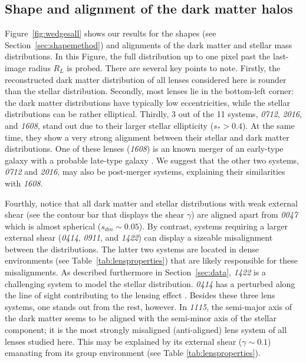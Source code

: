 \documentclass[useAMS,usenatbib]{mn2e}
\begin{document}
\subsection{Shape and alignment of the dark matter halos}
Figure~\ref{fig:wedgesall} shows our results for the shapes (see Section~\ref{sec:shapemethod}) and alignments of the dark matter and stellar mass distributions. In this Figure, the full distribution up to one pixel past the last-image radius $R_{L}$ is probed. There are several key points to note. Firstly, the reconstructed dark matter distribution of all lenses considered here is rounder than the stellar distribution. Secondly, most lenses lie in the bottom-left corner: the dark matter distributions have typically low eccentricities, while the stellar distributions can be rather elliptical. Thirdly, 3 out of the 11 systems, {\it0712}, {\it2016}, and {\it1608}, stand out due to their larger stellar ellipticity ($s_* > 0.4$). At the same time, they show a very strong alignment between their stellar and dark matter distributions. One of these lenses ({\it1608}) is an known merger of an early-type galaxy with a probable late-type galaxy \citep{2003ApJ...584..100S}. We suggest that the other two systems, {\it0712} and {\it2016}, may also be post-merger systems, explaining their similarities with {\it1608}.

Fourthly, notice that all dark matter and stellar distributions with weak external shear (see the contour bar that displays the shear $\gamma$) are aligned apart from {\it0047} which is almost spherical ($s_{dm}\sim0.05$). By contrast, systems requiring a larger external shear ({\it0414}, {\it0911}, and {\it1422}) can display a sizeable misalignment between the distributions. The latter two systems are located in dense environments (see Table~\ref{tab:lensproperties}) that are likely responsible for these misalignments. As described furthermore in Section~\ref{sec:data}, {\it1422} is a challenging system to model the stellar distribution. {\it0414} has a perturbed along the line of sight contributing to the lensing effect \citep{2011MNRAS.413L..86C}. Besides these three lens systems, one stands out from the rest, however. In {\it1115}, the semi-major axis of the dark matter seems to be aligned with the semi-minor axis of the stellar component; it is the most strongly misaligned (anti-aligned) lens system of all lenses studied here. This may be explained by its external shear ($\gamma \sim 0.1$) emanating from its group environment (see Table \ref{tab:lensproperties}).
\end{document}
